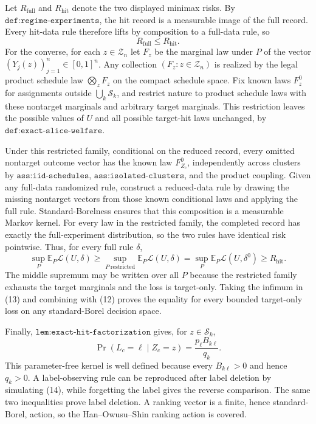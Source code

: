 Let \(R_{\mathrm{full}}\) and \(R_{\mathrm{hit}}\) denote the two displayed minimax risks.  By \(\texttt{def:regime-experiments}\), the hit record is a measurable image of the full record.  Every hit-data rule therefore lifts by composition to a full-data rule, so
\[
R_{\mathrm{full}}\leq R_{\mathrm{hit}}. \tag{12}
\]
For the converse, for each \(z\in\mathcal Z_n\) let \(F_z\) be the marginal law under \(P\) of the vector \((Y_j(z))_{j=1}^n\in[0,1]^n\).  Any collection \((F_z:z\in\mathcal Z_n)\) is realized by the legal product schedule law \(\bigotimes_zF_z\) on the compact schedule space.  Fix known laws \(F_z^0\) for assignments outside \(\bigcup_k\mathcal S_k\), and restrict nature to product schedule laws with these nontarget marginals and arbitrary target marginals.  This restriction leaves the possible values of \(U\) and all possible target-hit laws unchanged, by \(\texttt{def:exact-slice-welfare}\).

Under this restricted family, conditional on the reduced record, every omitted nontarget outcome vector has the known law \(F_{Z_c}^0\), independently across clusters by \(\texttt{ass:iid-schedules}\), \(\texttt{ass:isolated-clusters}\), and the product coupling.  Given any full-data randomized rule, construct a reduced-data rule by drawing the missing nontarget vectors from those known conditional laws and applying the full rule.  Standard-Borelness ensures that this composition is a measurable Markov kernel.  For every law in the restricted family, the completed record has exactly the full-experiment distribution, so the two rules have identical risk pointwise.  Thus, for every full rule \(\delta\),
\[
\sup_P\mathbb E_P\mathcal L(U,\delta)
\geq \sup_{P\ \mathrm{restricted}}\mathbb E_P\mathcal L(U,\delta)
=\sup_P\mathbb E_P\mathcal L(U,\delta^0)
\geq R_{\mathrm{hit}}. \tag{13}
\]
The middle supremum may be written over all \(P\) because the restricted family exhausts the target marginals and the loss is target-only.  Taking the infimum in (13) and combining with (12) proves the equality for every bounded target-only loss on any standard-Borel decision space.

Finally, \(\texttt{lem:exact-hit-factorization}\) gives, for \(z\in\mathcal S_k\),
\[
\Pr(L_c=\ell\mid Z_c=z)=\frac{p_\ell B_{k\ell}}{q_k}. \tag{14}
\]
This parameter-free kernel is well defined because every \(B_{k\ell}>0\) and hence \(q_k>0\).  A label-observing rule can be reproduced after label deletion by simulating (14), while forgetting the label gives the reverse comparison.  The same two inequalities prove label deletion.  A ranking vector is a finite, hence standard-Borel, action, so the Han--Owusu--Shin ranking action is covered.
